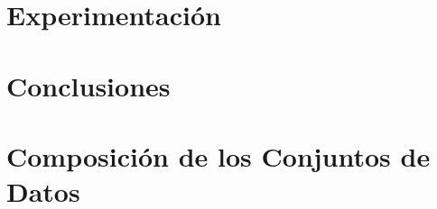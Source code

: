     \chapter{Experimentación}\label{ch:results}
    

    \backmatter

    \chapter*{Conclusiones}\label{ch:conclusion}
    

    

    \appendix
    \chapter{Composición de los Conjuntos de Datos}\label{ch:datasetsComposition}
    


